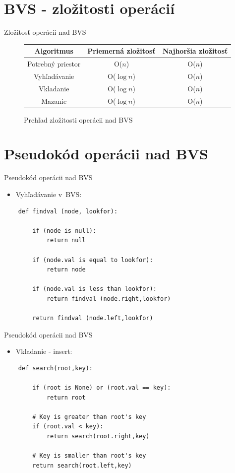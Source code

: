 \documentclass[10pt]{beamer}
\begin{document}
\section{BVS - zložitosti operácií}
\begin{frame}{Zložitosť operácii nad BVS}
    \begin{figure}
    \begin{tabular}{||c c c||}\hline
         \bf{Algoritmus} & \bf{Priemerná zložitosť} & \bf{Najhoršia zložitosť} \\ [0.5ex] 
         \hline\hline
         Potrebný priestor & O(${n}$) & O(${n}$)\\ 
         \hline\hline
         Vyhľadávanie & O($\log{n}$) & O(${n}$)\\ 
         \hline\hline
         Vkladanie & O($\log{n}$) & O(${n}$)\\
         \hline\hline
         Mazanie & O($\log{n}$) & O(${n}$)\\
         \hline
    \end{tabular}
    \caption{Prehľad zložitosti operácii nad BVS}
    \end{figure}
\end{frame}

\section{Pseudokód operácii nad BVS}
\begin{frame}[fragile]{Pseudokód operácii nad BVS}
    \begin{itemize}
        \item{Vyhľadávanie v~BVS:}
    \end{itemize}
    \begin{lstlisting}
    def findval (node, lookfor):
    
        if (node is null):
            return null
            
        if (node.val is equal to lookfor):
            return node
            
        if (node.val is less than lookfor):
            return findval (node.right,lookfor)
            
        return findval (node.left,lookfor)
    \end{lstlisting}
\end{frame}

\begin{frame}[fragile]{Pseudokód operácii nad BVS}
    \begin{itemize}
        \item{Vkladanie - insert:}
    \end{itemize}
    \begin{lstlisting}
    def search(root,key):
    
        if (root is None) or (root.val == key):
            return root
     
        # Key is greater than root's key
        if (root.val < key):
            return search(root.right,key)
       
        # Key is smaller than root's key
        return search(root.left,key)
    \end{lstlisting}
\end{frame}
\end{document}
